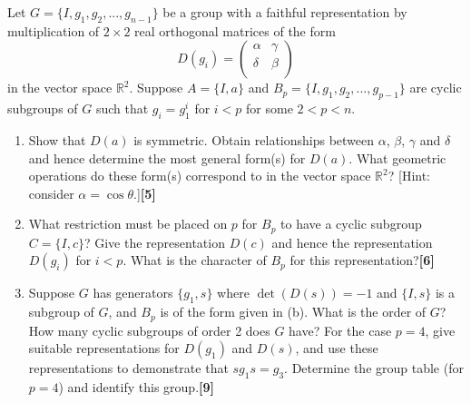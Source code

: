 \documentclass[a4paper]{article}
\begin{document}
\newpage
\begin{qns}
Let $G = \{I, g_1, g_2,..., g_{n−1}\}$ be a group with a faithful representation by multiplication of $2\times 2$ real orthogonal matrices of the form
$$D(g_i)=\begin{pmatrix}\alpha&\gamma\\\delta&\beta\\\end{pmatrix}$$
in the vector space $\mathbb{R}^2$. Suppose $A=\{I,a\}$ and $B_p=\{I,g_1,g_2,...,g_{p-1}\}$ are cyclic subgroups of $G$ such that $g_i=g^i_1$ for $i<p$ for some $2<p<n$.
\begin{enumerate}[label=(\alph*)]
\item Show that $D(a)$ is symmetric. Obtain relationships between $\alpha$, $\beta$, $\gamma$ and $\delta$ and hence determine the most general form(s) for $D(a)$. What geometric operations do these form(s) correspond to in the vector space $\mathbb{R}^2$? [Hint: consider $\alpha=\cos\theta$.]\hfill\textbf{[5]}
\item What restriction must be placed on $p$ for $B_p$ to have a cyclic subgroup $C = \{I, c\}$? Give the representation $D(c)$ and hence the representation $D(g_i)$ for $i < p$. What is the character of $B_p$ for this representation?\hfill\textbf{[6]}
\item Suppose $G$ has generators $\{g_1, s\}$ where $\det(D(s)) = −1$ and $\{I, s\}$ is a subgroup of $G$, and $B_p$ is of the form given in (b). What is the order of $G$? How many cyclic subgroups of order 2 does $G$ have? For the case $p = 4$, give suitable representations for $D(g_1)$ and $D(s)$, and use these representations to demonstrate that $sg_1s=g_3$. Determine the group table (for $p = 4$) and identify this group.\hfill\textbf{[9]}
\end{enumerate}
\end{qns}
\end{document}
